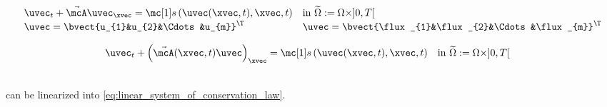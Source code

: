 \begin{defnbox}\nospacing
    \begin{defn}
        \label{defn:linear_system_of_conservation_laws}
        \begin{align}
          &\uvec_{t}+\linfluxvec\uvec_{\xvec}=\sourceterm\left(\uvec(\xvec,t),\xvec,t\right)&&
                                                                                         \text{in }\widetilde{\Omega}:=\Omega\times]0,T[\nonumber \\[-1\jot]
          &\uvec=\bvect{u_{1}&u_{2}&\Cdots&u_{m}}^{\T}&&\uvec=\bvect{\flux_{1}&\flux_{2}&\Cdots&\flux_{m}}^{\T}\label{eq:linear_system_of_conservation_law}
        \end{align}
    \end{defn}
\end{defnbox}
\begin{corbox}\nospacing
    \begin{cor}\label{cor:linear_system_of_conservation_laws_with_variable_coefficients}
        \begin{align}
          &\uvec_{t}+\left(\linfluxvec(\xvec,t)\uvec\right)_{\xvec}=\sourceterm\left(\uvec(\xvec,t),\xvec,t\right)&&
                    \text{in }\widetilde{\Omega}:=\Omega\times]0,T[\label{eq:linear_system_of_conservation_law_variable_coef}
        \end{align}
    \end{cor}
\end{corbox}
\begin{corbox}\nospacing
    \begin{cor}
        \label{cor:linearizing_systems_of_consveration_laws}
        \leavevmode\\
         can be linearized into \cref{eq:linear_system_of_conservation_law}.
    \end{cor}
\end{corbox}
